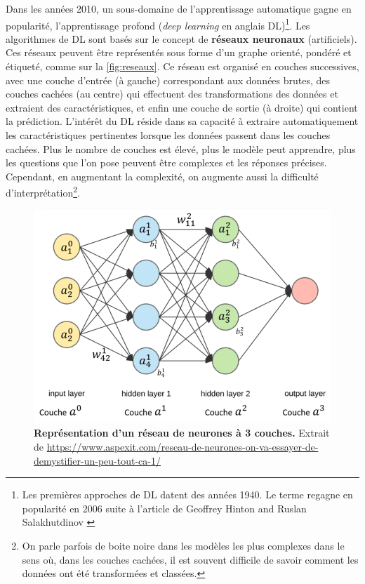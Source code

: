 Dans les années 2010, un sous-domaine de l'apprentissage automatique gagne en popularité, l'apprentissage profond (\textit{deep learning} en anglais DL)\footnote{Les premières approches de DL datent des années 1940. Le terme regagne en popularité en 2006 suite à l'article de Geoffrey Hinton and Ruslan Salakhutdinov \cite{hinton_fast_2006}}. Les algorithmes de DL sont basés sur le concept de \textbf{réseaux neuronaux} (artificiels). Ces réseaux peuvent être représentés sous forme d'un graphe orienté, pondéré et étiqueté, comme sur la \autoref{fig:reseaux}. Ce réseau est organisé en couches successives, avec une couche d'entrée (à gauche) correspondant aux données brutes, des couches cachées (au centre) qui effectuent des transformations des données et extraient des caractéristiques, et enfin une couche de sortie (à droite) qui contient la prédiction. L'intérêt du DL réside dans sa capacité à extraire automatiquement les caractéristiques pertinentes lorsque les données passent dans les couches cachées. Plus le nombre de couches est élevé, plus le modèle peut apprendre, plus les questions que l'on pose peuvent être complexes et les réponses précises. Cependant, en augmentant la complexité, on augmente aussi la difficulté d'interprétation\footnote{On parle parfois de boite noire dans les modèles les plus complexes dans le sens où, dans les couches cachées, il est souvent difficile de savoir comment les données ont été transformées et classées.}. 

\begin{figure}
    \centering
    \includegraphics[width=0.5\linewidth]{images/reseaux_neurone.png}
    \caption[Représentation d'un réseau de neurone à 3 couches]{\textbf{Représentation d'un réseau de neurones à 3 couches.} Extrait de \url{https://www.aspexit.com/reseau-de-neurones-on-va-essayer-de-demystifier-un-peu-tout-ca-1/}}
    \label{fig:reseaux}
\end{figure}

